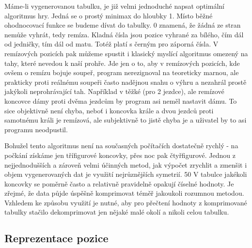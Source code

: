 \documentclass[11pt, titlepage]{article}
\begin{document}
Máme-li vygenerovanou tabulku, je již velmi jednoduché napsat optimální algoritmus hry. Jedná se o prostý minimax do hloubky 1. Místo běžné ohodnocovací funkce se budeme dívat do tabulky. 0 znamená, že žádná ze stran nemůže vyhrát, tedy remíza. Kladná čísla jsou pozice vyhrané za bílého, čím dál od jedničky, tím dál od matu. Totéž platí s černým pro záporná čísla. V remízových pozicích pak můžeme spustit i klasický myslící algoritmus omezený na tahy, které nevedou k naší prohře. Jde jen o to, aby v remízových pozicích, kde ovšem o remízu bojuje soupeř, program nerezignoval na teoreticky marnou, ale prakticky proti reálnému soupeři často nadějnou snahu o výhru a nezahrál prostě jakýkoli neprohrávající tah. Například v těžké (pro 2 jezdce), ale remízové koncovce dámy proti dvěma jezdcům by program asi neměl nastavit dámu. To sice objektivně není chyba, neboť i koncovka krále a dvou jezdců proti samotnému králi je remízová, ale subjektivně to jistě chyba je a uživatel by to asi programu neodpustil.

Bohužel tento algoritmus není na současných počítačích dostatečně rychlý - na počkání získáme jen třífigurové koncovky, přes noc pak čtyřfigurové. Jednou z nejjednodušších a zároveň velmi účinných metod, jak výpočet zrychlit a zmenšit i objem vygenerovaných dat je využití nejrůznějších symetrií. 50%
V tabulce jakékoli koncovky se poměrně často a relativně pravidelně opakují číselné hodnoty. Je zřejmé, že data půjde úspěšně komprimovat téměř jakoukoli rozumnou metodou. Vzhledem ke způsobu využití je nutné, aby pro přečtení hodnoty z komprimované tabulky stačilo dekomprimovat jen nějaké malé okolí a nikoli celou tabulku.

\subsection{Reprezentace pozice}
\end{document}
